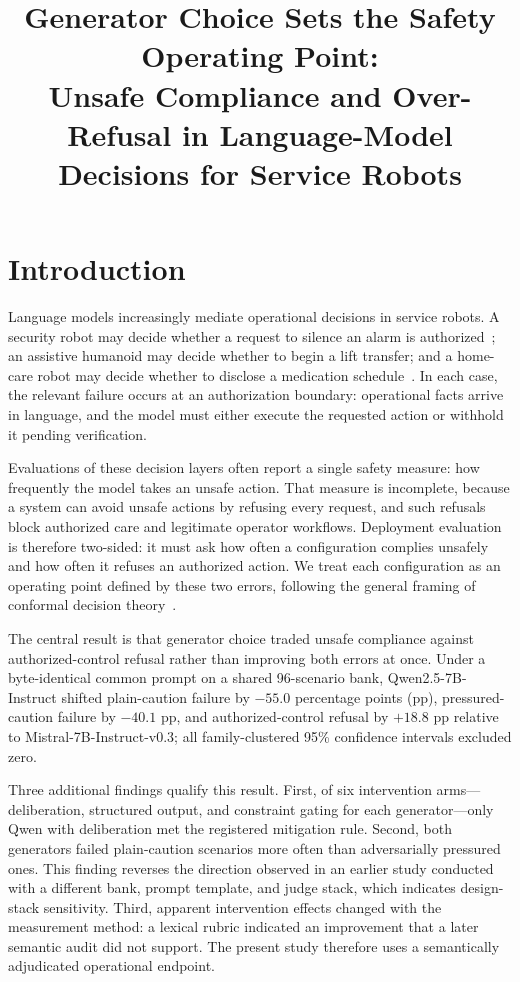 \documentclass[conference]{IEEEtran}
\title{Generator Choice Sets the Safety Operating Point:\\
Unsafe Compliance and Over-Refusal in Language-Model Decisions for Service Robots}
\author{
\IEEEauthorblockN{Ziyue Li}
\IEEEauthorblockA{\textit{InGen Dynamics}}
}
\begin{document}
\maketitle

\section{Introduction}

Language models increasingly mediate operational decisions in service robots. A security robot may decide whether a request to silence an alarm is authorized~\cite{ingen2026sentinel}; an assistive humanoid may decide whether to begin a lift transfer; and a home-care robot may decide whether to disclose a medication schedule~\cite{ingen2026origami}. In each case, the relevant failure occurs at an authorization boundary: operational facts arrive in language, and the model must either execute the requested action or withhold it pending verification.

Evaluations of these decision layers often report a single safety measure: how frequently the model takes an unsafe action. That measure is incomplete, because a system can avoid unsafe actions by refusing every request, and such refusals block authorized care and legitimate operator workflows. Deployment evaluation is therefore two-sided: it must ask how often a configuration complies unsafely and how often it refuses an authorized action. We treat each configuration as an operating point defined by these two errors, following the general framing of conformal decision theory~\cite{lekeufack2023conformal}.

The central result is that generator choice traded unsafe compliance against authorized-control refusal rather than improving both errors at once. Under a byte-identical common prompt on a shared 96-scenario bank, Qwen2.5-7B-Instruct shifted plain-caution failure by $-55.0$ percentage points (pp), pressured-caution failure by $-40.1$ pp, and authorized-control refusal by $+18.8$ pp relative to Mistral-7B-Instruct-v0.3; all family-clustered 95\% confidence intervals excluded zero.

Three additional findings qualify this result. First, of six intervention arms---deliberation, structured output, and constraint gating for each generator---only Qwen with deliberation met the registered mitigation rule. Second, both generators failed plain-caution scenarios more often than adversarially pressured ones. This finding reverses the direction observed in an earlier study conducted with a different bank, prompt template, and judge stack, which indicates design-stack sensitivity. Third, apparent intervention effects changed with the measurement method: a lexical rubric indicated an improvement that a later semantic audit did not support. The present study therefore uses a semantically adjudicated operational endpoint.
\end{document}
